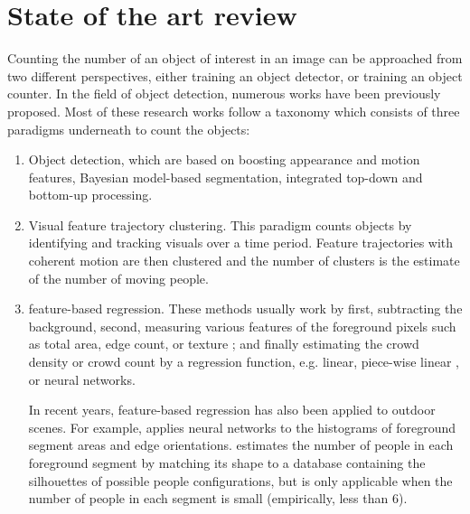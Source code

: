 \newpage
\chapter{State of the art review}
\label{sec:related_work}
Counting the number of an object of interest in an image can be approached from two different perspectives, either training an object detector, or training an object counter\cite{segui2015learning}. In the field of object detection, numerous works have been previously proposed\cite{paragios2001mrf, cho1999neural, regazzoni1996distributed, davies1995crowd, kong2005counting, marana1998efficacy, viola2004robust}. Most of these research works follow a taxonomy which consists of three paradigms underneath to count the objects:
\begin{enumerate}
	\item Object detection, which are based on boosting appearance and motion features\cite{viola2005detecting, viola2004robust}, Bayesian model-based segmentation\cite{zhao2003bayesian}, integrated top-down and bottom-up processing\cite{leibe2005pedestrian, oliva2003top}\cite{chan2008privacy}.
	\item Visual feature trajectory clustering. This paradigm counts objects by identifying and tracking visuals over a  time period. Feature trajectories with coherent motion are then clustered and the number of clusters is the estimate of the number of moving people\cite{rabaud2006counting, brostow2006unsupervised}\cite{chan2008privacy}. 
	\item feature-based regression. These methods usually work by first, subtracting the background, second, measuring various features of the foreground pixels such as total area\cite{paragios2001mrf, davies1995crowd}, edge count\cite{cho1999neural, regazzoni1996distributed}, or texture \cite{marana1998efficacy}; and finally estimating the crowd density or crowd count by a regression function, e.g. linear\cite{paragios2001mrf, davies1995crowd}, piece-wise linear \cite{regazzoni1996distributed}, or neural networks\cite{cho1999neural, regazzoni1996distributed}. 

	\indent In recent years, feature-based regression has also been applied to outdoor scenes. For example, \cite{kong2005counting} applies neural networks to the histograms of foreground segment areas and edge orientations. \cite{dong2007fast} estimates the number of people in each foreground segment by matching its shape to a database containing the silhouettes of possible people configurations, but is only applicable when the number of people in each segment is small (empirically, less than 6)\cite{chan2008privacy}.  
\end{enumerate} 
